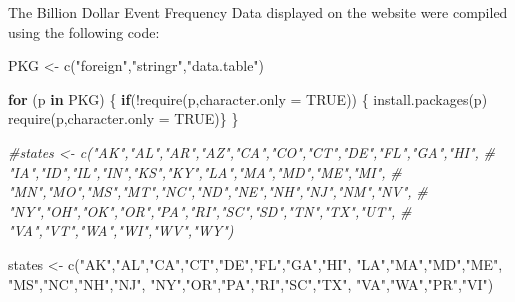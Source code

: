 \documentclass[
]{book}
\newenvironment{Shaded}{\begin{snugshade}}{\end{snugshade}}
\newcommand{\AttributeTok}[1]{\textcolor[rgb]{0.77,0.63,0.00}{#1}}
\newcommand{\CommentTok}[1]{\textcolor[rgb]{0.56,0.35,0.01}{\textit{#1}}}
\newcommand{\ConstantTok}[1]{\textcolor[rgb]{0.00,0.00,0.00}{#1}}
\newcommand{\ControlFlowTok}[1]{\textcolor[rgb]{0.13,0.29,0.53}{\textbf{#1}}}
\newcommand{\FunctionTok}[1]{\textcolor[rgb]{0.00,0.00,0.00}{#1}}
\newcommand{\NormalTok}[1]{#1}
\newcommand{\OtherTok}[1]{\textcolor[rgb]{0.56,0.35,0.01}{#1}}
\newcommand{\SpecialCharTok}[1]{\textcolor[rgb]{0.00,0.00,0.00}{#1}}
\newcommand{\StringTok}[1]{\textcolor[rgb]{0.31,0.60,0.02}{#1}}
\begin{document}
The Billion Dollar Event Frequency Data displayed on the website were compiled using the following code:

\begin{Shaded}
\begin{Highlighting}[]
\NormalTok{PKG }\OtherTok{\textless{}{-}} \FunctionTok{c}\NormalTok{(}\StringTok{"foreign"}\NormalTok{,}\StringTok{"stringr"}\NormalTok{,}\StringTok{"data.table"}\NormalTok{)}

\ControlFlowTok{for}\NormalTok{ (p }\ControlFlowTok{in}\NormalTok{ PKG) \{}
  \ControlFlowTok{if}\NormalTok{(}\SpecialCharTok{!}\FunctionTok{require}\NormalTok{(p,}\AttributeTok{character.only =} \ConstantTok{TRUE}\NormalTok{)) \{  }
    \FunctionTok{install.packages}\NormalTok{(p)}
    \FunctionTok{require}\NormalTok{(p,}\AttributeTok{character.only =} \ConstantTok{TRUE}\NormalTok{)\}}
\NormalTok{\}}

\CommentTok{\#states \textless{}{-} c("AK","AL","AR","AZ","CA","CO","CT","DE","FL","GA","HI",}
\CommentTok{\#            "IA","ID","IL","IN","KS","KY","LA","MA","MD","ME","MI",}
\CommentTok{\#            "MN","MO","MS","MT","NC","ND","NE","NH","NJ","NM","NV",}
\CommentTok{\#            "NY","OH","OK","OR","PA","RI","SC","SD","TN","TX","UT",}
\CommentTok{\#           "VA","VT","WA","WI","WV","WY")}

\NormalTok{states }\OtherTok{\textless{}{-}} \FunctionTok{c}\NormalTok{(}\StringTok{"AK"}\NormalTok{,}\StringTok{"AL"}\NormalTok{,}\StringTok{"CA"}\NormalTok{,}\StringTok{"CT"}\NormalTok{,}\StringTok{"DE"}\NormalTok{,}\StringTok{"FL"}\NormalTok{,}\StringTok{"GA"}\NormalTok{,}\StringTok{"HI"}\NormalTok{,}
            \StringTok{"LA"}\NormalTok{,}\StringTok{"MA"}\NormalTok{,}\StringTok{"MD"}\NormalTok{,}\StringTok{"ME"}\NormalTok{,}
            \StringTok{"MS"}\NormalTok{,}\StringTok{"NC"}\NormalTok{,}\StringTok{"NH"}\NormalTok{,}\StringTok{"NJ"}\NormalTok{,}
            \StringTok{"NY"}\NormalTok{,}\StringTok{"OR"}\NormalTok{,}\StringTok{"PA"}\NormalTok{,}\StringTok{"RI"}\NormalTok{,}\StringTok{"SC"}\NormalTok{,}\StringTok{"TX"}\NormalTok{,}
            \StringTok{"VA"}\NormalTok{,}\StringTok{"WA"}\NormalTok{,}\StringTok{"PR"}\NormalTok{,}\StringTok{"VI"}\NormalTok{)}


\end{Highlighting}
\end{Shaded}
\end{document}
